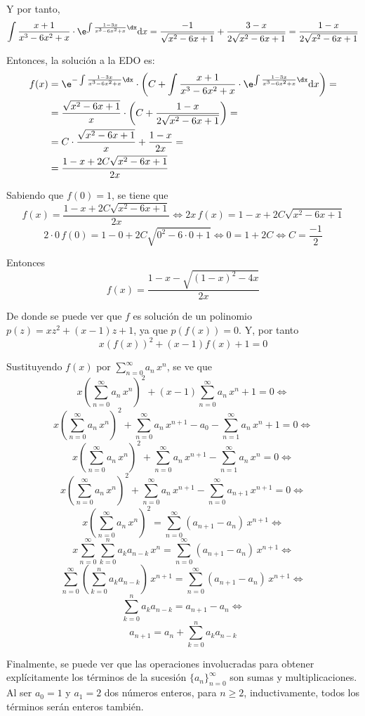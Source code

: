 \documentclass[../../main.tex]{subfiles}
\begin{document}
  Y por tanto,
  $$
  \int \frac{x + 1}{x^3 - 6 x^2 + x} \cdot \e^{\int \frac{1 - 3x}{x^3 - 6 x^2 +x} \dx} \text{d}x = \frac{-1}{\sqrt{x^2 - 6x + 1}} + \frac{3 - x}{2 \sqrt{x^2 - 6x + 1}} = \frac{1 - x}{2 \sqrt{x^2 - 6x + 1}}
  $$

  Entonces, la solución a la EDO es:
  \begin{equation*}
    \begin{split}
      f(x) & = \e^{- \int \frac{1 - 3x}{x^3 - 6 x^2 + x} \dx} \cdot \left(C + \int \frac{x + 1}{x^3 - 6 x^2 + x} \cdot \e^{\int \frac{1 - 3x}{x^3 - 6 x^2 +x} \dx} \text{d}x\right) = \\ & =
      \frac{\sqrt{x^2 - 6x + 1}}{x} \cdot \left(C + \frac{1 - x}{2 \sqrt{x^2 - 6x + 1}}\right) = \\ & =
      C \cdot\frac{\sqrt{x^2 - 6x + 1}}{x} + \frac{1 - x}{2 x} = \\ & =
      \frac{1 - x + 2 C \sqrt{x^2 - 6x + 1}}{2 x}
    \end{split}
  \end{equation*}

  Sabiendo que $f(0) = 1$, se tiene que
  $$
  f(x) = \frac{1 - x + 2 C \sqrt{x^2 - 6x + 1}}{2 x} \iff 2x \, f(x) = 1 - x + 2 C \sqrt{x^2 - 6x + 1}
  $$
  $$
  2 \cdot 0 \, f(0) = 1 - 0 + 2 C \sqrt{0^2 - 6 \cdot 0 + 1} \iff 0 = 1 + 2C \iff C = \frac{-1}{2}
  $$

  Entonces
  $$
  f(x) = \frac{1 - x - \sqrt{(1 - x)^2 - 4x}}{2 x}
  $$

  De donde se puede ver que $f$ es solución de un polinomio $p(z) = x z^2 + (x - 1) z + 1$, ya que $p(f(x)) = 0$. Y, por tanto
  $$
  x (f(x))^2 + (x - 1) f(x) + 1 = 0
  $$

  Sustituyendo $f(x)$ por $\displaystyle\sum_{n = 0}^\infty a_n \, x^n$, se ve que
  $$
  x \left(\sum_{n = 0}^\infty a_n \, x^n\right)^2 + (x - 1) \sum_{n = 0}^\infty a_n \, x^n + 1 = 0 \iff
  $$
  $$
  x \left(\sum_{n = 0}^\infty a_n \, x^n\right)^2 + \sum_{n = 0}^\infty a_n \, x^{n + 1} - a_0 - \sum_{n = 1}^\infty a_n \, x^n + 1 = 0 \iff
  $$
  $$
  x \left(\sum_{n = 0}^\infty a_n \, x^n\right)^2 + \sum_{n = 0}^\infty a_n \, x^{n + 1} - \sum_{n = 1}^\infty a_n \, x^n = 0 \iff
  $$
  $$
  x \left(\sum_{n = 0}^\infty a_n \, x^n\right)^2 + \sum_{n = 0}^\infty a_n \, x^{n + 1} - \sum_{n = 0}^\infty a_{n + 1} \, x^{n + 1} = 0 \iff
  $$
  $$
  x \left(\sum_{n = 0}^\infty a_n \, x^n\right)^2 = \sum_{n = 0}^\infty (a_{n + 1} - a_n)\, x^{n + 1} \iff
  $$
  $$
  x \sum_{n = 0}^\infty \sum_{k = 0}^n a_k a_{n - k} \, x^n = \sum_{n = 0}^\infty (a_{n + 1} - a_n)\, x^{n + 1} \iff
  $$
  $$
  \sum_{n = 0}^\infty \left(\sum_{k = 0}^n a_k a_{n - k}\right) \, x^{n + 1} = \sum_{n = 0}^\infty (a_{n + 1} - a_n)\, x^{n + 1} \iff
  $$
  $$
  \sum_{k = 0}^n a_k a_{n - k} = a_{n + 1} - a_n \iff
  $$
  $$
  a_{n + 1} = a_n + \sum_{k = 0}^n a_k a_{n - k}
  $$

  Finalmente, se puede ver que las operaciones involucradas para obtener explícitamente los términos de la sucesión $\{a_n\}_{n = 0}^\infty$ son sumas y multiplicaciones. Al ser $a_0 = 1$ y $a_1 = 2$ dos números enteros, para $n \geq 2$, inductivamente, todos los términos serán enteros también.
\end{document}
